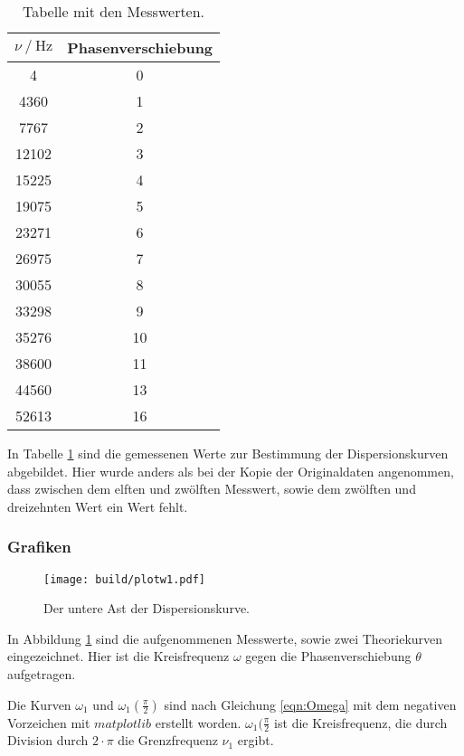 \begin{table}
  \centering
  \caption{Tabelle mit den Messwerten.}
  \label{tab:wertedis}
  \begin{tabular}{c c}
    \toprule
     $\nu \ /\ \si{\hertz}$ & Phasenverschiebung\\
    \midrule
    4 & 0\\
    4360 & 1\\
    7767 & 2\\
    12102 & 3\\
    15225 & 4\\
    19075 & 5\\
    23271 & 6\\
    26975 & 7\\
    30055 & 8\\
    33298 & 9\\
    35276 & 10\\
    38600 & 11\\
    44560 & 13\\
    52613 & 16\\
    \bottomrule
  \end{tabular}
\end{table}

In Tabelle \ref{tab:wertedis} sind die gemessenen Werte zur Bestimmung der
Dispersionskurven abgebildet. Hier wurde anders als bei der Kopie der
Originaldaten angenommen, dass zwischen dem elften und zwölften Messwert,
sowie dem zwölften und dreizehnten Wert ein Wert fehlt.

\subsubsection{Grafiken}

\begin{figure}
  \centering
  \texttt{[image: build/plotw1.pdf]}
  \caption{Der untere Ast der Dispersionskurve.}
  \label{fig:astw1}
\end{figure}

In Abbildung \ref{fig:astw1} sind die aufgenommenen Messwerte, sowie zwei
Theoriekurven eingezeichnet. Hier ist die Kreisfrequenz $\omega$ gegen die
Phasenverschiebung
$\theta$ aufgetragen.

Die Kurven $\omega_1$ und $\omega_1(\frac{\pi}{2})$ sind nach Gleichung
\eqref{eqn:Omega} mit dem negativen
Vorzeichen mit $matplotlib$ \cite{matplotlib} erstellt worden.
$\omega_1(\frac{\pi}{2}$ ist die Kreisfrequenz, die durch Division durch
$2\cdot\pi$ die Grenzfrequenz $\nu_1$ ergibt.


